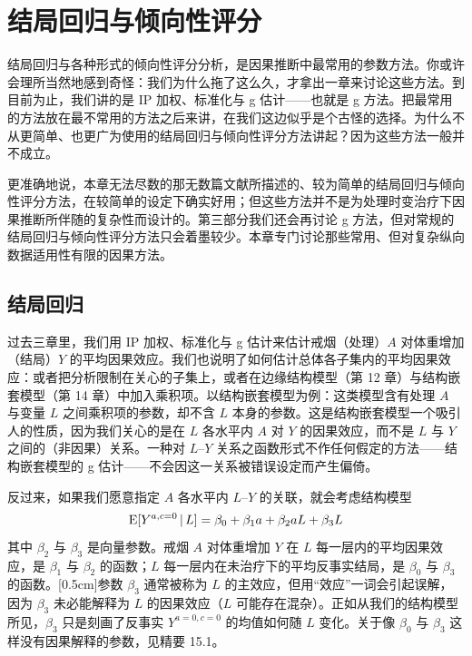\chapter{结局回归与倾向性评分}

结局回归与各种形式的倾向性评分分析，是因果推断中最常用的参数方法。你或许会理所当然地感到奇怪：我们为什么拖了这么久，才拿出一章来讨论这些方法。到目前为止，我们讲的是 IP 加权、标准化与 g 估计——也就是 g 方法。把最常用的方法放在最不常用的方法之后来讲，在我们这边似乎是个古怪的选择。为什么不从更简单、也更广为使用的结局回归与倾向性评分方法讲起？因为这些方法一般并不成立。

更准确地说，本章无法尽数的那无数篇文献所描述的、较为简单的结局回归与倾向性评分方法，在较简单的设定下确实好用；但这些方法并不是为处理时变治疗下因果推断所伴随的复杂性而设计的。第三部分我们还会再讨论 g 方法，但对常规的结局回归与倾向性评分方法只会着墨较少。本章专门讨论那些常用、但对复杂纵向数据适用性有限的因果方法。

\section{结局回归}

过去三章里，我们用 IP 加权、标准化与 g 估计来估计戒烟（处理）$A$ 对体重增加（结局）$Y$ 的平均因果效应。我们也说明了如何估计总体各子集内的平均因果效应：或者把分析限制在关心的子集上，或者在边缘结构模型（第 12 章）与结构嵌套模型（第 14 章）中加入乘积项。以结构嵌套模型为例：这类模型含有处理 $A$ 与变量 $L$ 之间乘积项的参数，却不含 $L$ 本身的参数。这是结构嵌套模型一个吸引人的性质，因为我们关心的是在 $L$ 各水平内 $A$ 对 $Y$ 的因果效应，而不是 $L$ 与 $Y$ 之间的（非因果）关系。一种对 $L$–$Y$ 关系之函数形式不作任何假定的方法——结构嵌套模型的 g 估计——不会因这一关系被错误设定而产生偏倚。

反过来，如果我们愿意指定 $A$ 各水平内 $L$–$Y$ 的关联，就会考虑结构模型
\[
\mathrm{E}[Y^{a,c=0}\,|\, L]=\beta_0+\beta_1 a+\beta_2 aL+\beta_3 L
\]
其中 $\beta_2$ 与 $\beta_3$ 是向量参数。戒烟 $A$ 对体重增加 $Y$ 在 $L$ 每一层内的平均因果效应，是 $\beta_1$ 与 $\beta_2$ 的函数；$L$ 每一层内在未治疗下的平均反事实结局，是 $\beta_0$ 与 $\beta_3$ 的函数。[0.5cm]参数 $\beta_3$ 通常被称为 $L$ 的主效应，但用“效应”一词会引起误解，因为 $\beta_3$ 未必能解释为 $L$ 的因果效应（$L$ 可能存在混杂）。正如从我们的结构模型所见，$\beta_3$ 只是刻画了反事实 $Y^{a=0,c=0}$ 的均值如何随 $L$ 变化。关于像 $\beta_0$ 与 $\beta_3$ 这样没有因果解释的参数，见精要 15.1。

